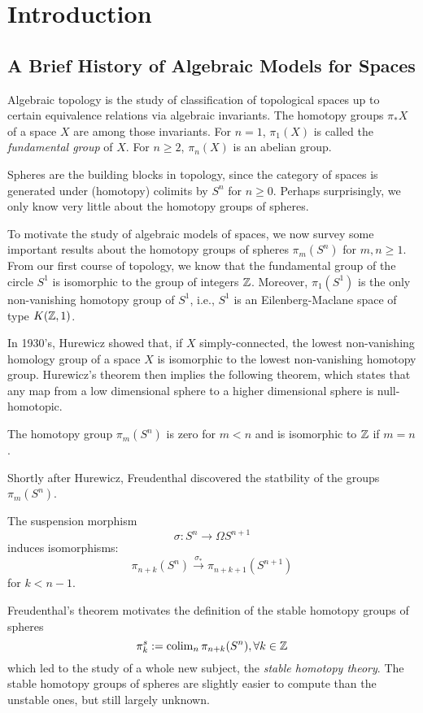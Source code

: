 \chapter{Introduction}

\section{A Brief History of Algebraic Models for Spaces}

Algebraic topology is the study of classification of topological spaces up to certain equivalence relations via algebraic invariants. 
The homotopy groups $\pi_* X$ of a space $X$ are among those invariants.
For $n=1$, $\pi_1(X)$ is called the \emph{fundamental group} of $X$. For $n\geq 2$, $\pi_n(X)$ is an abelian group. 

Spheres are the building blocks in topology, since the category of spaces is generated under (homotopy) colimits by $S^n$ for $n\geq 0$. Perhaps surprisingly, we only know very little about the homotopy groups of spheres. 

To motivate the study of algebraic models of spaces, we now survey some important results about the homotopy groups of spheres $\pi_m(S^n)$ for $m,n \geq 1$.
From our first course of topology, we know that the fundamental group of the circle $S^1$ is isomorphic to the group of integers ${\mathbb{Z}}$. Moreover, $\pi_1( S^1)$ is the only non-vanishing homotopy group of $S^1$, i.e., $S^1$ is an Eilenberg-Maclane space of type $K({\mathbb{Z}},1)$.

In 1930's, Hurewicz showed that, if $X$ simply-connected,  the lowest non-vanishing homology group of a space $X$ is isomorphic to the lowest non-vanishing homotopy group. Hurewicz's theorem then implies the following theorem, which states that any map from a low dimensional sphere to a higher dimensional sphere is null-homotopic.
\begin{theorem}
    [Hurewicz]
    The homotopy group $\pi_m(S^n)$ is zero for $m<n$ and is isomorphic to ${\mathbb{Z}}$ if $m=n$.
\end{theorem}
\clearpage

Shortly after Hurewicz, Freudenthal discovered the statbility of the groups $\pi_m(S^n)$.
\begin{theorem}
    The suspension morphism 
    $$
    \sigma: S^n \to \Omega S^{n+1}
    $$
    induces isomorphisms:
    $$
    \pi_{n+k}(S^n) \xrightarrow{\sigma_*} 
    \pi_{n+k+1}(S^{n+1})
    $$
    for $k<n-1$.
\end{theorem}
Freudenthal's theorem motivates the definition of the stable homotopy groups of spheres
$$
\pi^{s}_{k}:= \operatorname{colim}_n \pi_{n+k}(S^n), \forall k \in {\mathbb{Z}}
$$
which led to the study of a whole new subject, the \emph{stable homotopy theory}.
The stable homotopy groups of spheres are slightly easier to compute than the unstable ones, but still largely unknown.

